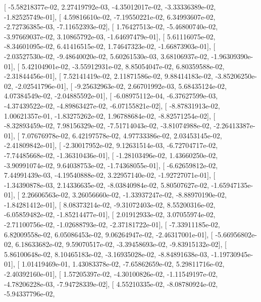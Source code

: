 \documentclass{article}
\begin{document}
       [ -5.58218377e-02,   2.27419792e-03,  -4.35012017e-02,
         -3.33336389e-02,  -1.82525749e-01],
       [  4.59816610e-02,  -7.19550221e-02,   6.34993607e-02,
         -2.72736385e-03,  -7.11652393e-02],
       [  1.76427513e-02,  -5.46800740e-02,  -3.97669037e-02,
          3.10865792e-03,  -1.64697479e-01],
       [  5.61116075e-02,  -8.34601095e-02,   6.41416515e-02,
          1.74647323e-02,  -1.66873903e-01],
       [ -2.03527530e-02,  -9.48640020e-02,   5.60261530e-03,
          3.68106937e-02,  -1.96309390e-01],
       [  5.42104901e-02,  -3.55912931e-02,   8.85054047e-02,
          6.80359588e-02,  -2.31844456e-01],
       [  7.52141419e-02,   2.11871586e-02,   9.88414183e-02,
         -3.85206250e-02,  -2.02541796e-01],
       [ -9.25632963e-02,   2.66701992e-03,   5.68435124e-02,
          4.07384549e-02,  -2.04885592e-01],
       [ -6.08975112e-04,  -6.37627599e-03,  -4.37439522e-02,
         -4.89863427e-02,  -6.07155821e-02],
       [ -8.87831913e-02,   1.00621357e-01,  -1.83275262e-02,
          1.96788684e-02,  -8.82571254e-02],
       [ -8.32893459e-02,   7.98156329e-02,  -7.51714043e-02,
         -3.81074988e-02,  -2.26413387e-01],
       [  7.07676978e-02,   6.42197578e-02,   4.97733386e-02,
          2.03453145e-02,  -2.41809842e-01],
       [ -2.30017952e-02,   9.12631514e-03,  -6.72704717e-02,
         -7.74485668e-02,  -1.36310436e-01],
       [ -1.28103496e-02,   1.43660250e-02,  -3.90991074e-02,
          9.64038753e-02,  -1.74368055e-01],
       [ -6.62659812e-02,   7.44991439e-03,  -4.19540888e-02,
          3.22957140e-02,  -1.92727071e-01],
       [ -1.34390878e-03,   2.14336635e-02,  -8.03840984e-02,
          5.80507627e-02,  -1.65947135e-01],
       [  2.26606563e-02,   3.26056660e-02,  -1.33937247e-02,
         -8.88970190e-02,  -1.84281412e-01],
       [  8.08373214e-02,  -9.31072403e-02,   8.55200316e-02,
         -6.05859482e-02,  -1.85214477e-01],
       [  2.01912933e-02,   3.07055974e-02,  -2.71100756e-02,
         -1.02688793e-02,  -2.37181722e-01],
       [ -7.33911185e-02,   6.82009558e-02,   6.05086453e-02,
          9.06264947e-02,  -2.46317001e-01],
       [ -5.66956802e-02,   6.18633682e-02,   9.59070517e-02,
         -3.39458693e-02,  -9.83915132e-02],
       [  5.86100648e-02,   8.10465183e-02,  -3.16935028e-02,
         -8.84891638e-03,  -1.19730945e-01],
       [  1.01419469e-01,   1.43083378e-02,  -7.65862659e-02,
          5.29811716e-02,  -2.40392160e-01],
       [  1.57205397e-02,  -4.30100826e-02,  -1.11549197e-02,
         -4.78206228e-03,  -7.94728339e-02],
       [  4.55210335e-02,  -8.08780924e-02,  -5.94337796e-02,
\end{document}
